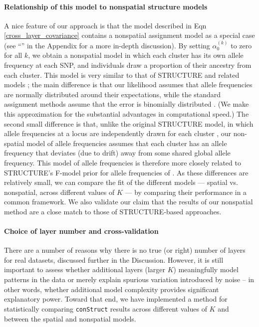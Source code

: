 \documentclass[12pt]{article}
\newcommand{\secref}[1]{``\nameref{#1}''}
\begin{document}
\paragraph{Relationship of this model to nonspatial structure models}

A nice feature of our approach is that the model described in Eqn \eqref{cross_layer_covariance} 
contains a nonspatial assignment model as a special case 
(see \secref{model_app} in the Appendix for a more in-depth discussion). 
By setting $\alpha_0^{(k)}$ to zero for all $k$, 
we obtain a nonspatial model in which each cluster has its own allele frequency at each SNP, 
and individuals draw a proportion of their ancestry from each cluster. 
This model is very similar to that of STRUCTURE \citep{STRUCTURE} 
and related models \citep[e.g.][]{ADMIXTURE}; 
the main difference is that our likelihood assumes that allele frequencies are normally distributed 
around their expectations, 
while the standard assignment methods assume that the error is binomially distributed \citep{Engelhardt2012}.  
(We make this approximation for the substantial advantages in
computational speed.)
The second small difference is that, unlike the original STRUCTURE model,
in which allele frequencies at a locus are independently drawn for each cluster \citep{STRUCTURE}, 
our non-spatial model of allele frequencies assumes 
that each cluster has an allele frequency that deviates 
(due to drift) away from some shared global allele frequency. 
This model of allele frequencies is therefore more 
closely related to STRUCTURE's F-model prior for allele frequencies of \citet{falush2003}.
As these differences are relatively small, 
we can compare the fit of the different models 
--- spatial vs. nonspatial, across different values of $K$ --- 
by comparing their performance in a common framework. 
We also validate our claim that the results of our nonspatial method 
are a close match to those of STRUCTURE-based approaches.

\paragraph{Choice of layer number and cross-validation}
There are a number of reasons 
why there is no true (or right) number of layers for real datasets,
discussed further in the Discussion.
However, it is still important to assess whether additional layers (larger $K$)
meaningfully model patterns in the data
or merely explain spurious variation introduced by noise
-- in other words, whether additional model complexity
provides significant explanatory power.
Toward that end, we have implemented a method for 
statistically comparing \texttt{conStruct} results across different values of $K$ 
and between the spatial and nonspatial models.
\end{document}
